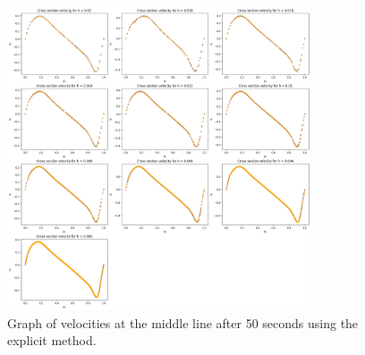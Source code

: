 \documentclass{article}
\begin{document}
\begin{figure}[h!] 
    \centering 
    \includegraphics[width=0.8\textwidth]{plots/lidDrivenACM_cross.png} 
    \caption{Graph of velocities at the middle line after 50 seconds using the explicit method.} 
    \label{fig:lidDrivenACM_cross} 
\end{figure}
\end{document}
